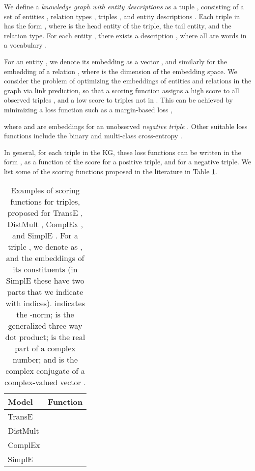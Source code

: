 \documentclass[sigconf]{acmart}
\begin{document}
We define a \textit{knowledge graph with entity descriptions} as a tuple , consisting of a set of entities , relation types , triples , and entity descriptions . Each triple in  has the form , where  is the head entity of the triple,  the tail entity, and  the relation type. For each entity , there exists a description , where all  are words in a vocabulary .

For an entity , we denote its embedding as a vector , and similarly  for the embedding of a relation , where  is the dimension of the embedding space. We consider the problem of optimizing the embeddings of entities and relations in the graph via link prediction, so that a scoring function  assigns a high score to all observed triples , and a low score to triples not in . This can be achieved by minimizing a loss function such as a margin-based loss \citep{bordes2011learning,bordes2013translating},

where  and  are embeddings for an unobserved \textit{negative triple} . Other suitable loss functions include the binary and multi-class cross-entropy \citep{trouillon2016complex,kadlec2017strike}.

In general, for each triple in the KG, these loss functions can be written in the form , as a function of the score  for a positive triple, and  for a negative triple. We list some of the scoring functions proposed in the literature in Table \ref{tab:scoring}.

\begin{table}
\caption{Examples of scoring functions for triples, proposed for TransE \citep{bordes2013translating}, DistMult \citep{yang2015embedding}, ComplEx \citep{trouillon2016complex}, and SimplE \citep{kazemi2018simple}. For a triple , we denote as ,  and  the embeddings of its constituents (in SimplE these have two parts that we indicate with indices).  indicates the -norm;  is the generalized three-way dot product;  is the real part of a complex number; and  is the complex conjugate of a complex-valued vector .}
\label{tab:scoring}
\centering
\begin{tabular}{lc}
\toprule
Model                                & Function \\
\midrule
TransE   &                       \\
DistMult &                           \\
ComplEx  &  \\
SimplE   &  \\
\bottomrule
\end{tabular}
\end{table}
\end{document}
